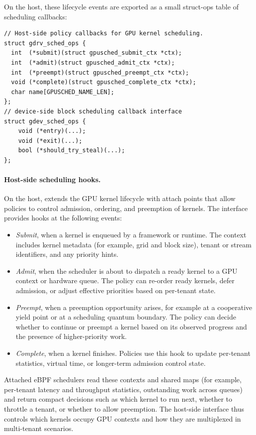 On the host, these lifecycle events are exported as a small struct-ops table of
scheduling callbacks:

\begin{verbatim}
// Host-side policy callbacks for GPU kernel scheduling.
struct gdrv_sched_ops {
  int  (*submit)(struct gpusched_submit_ctx *ctx);
  int  (*admit)(struct gpusched_admit_ctx *ctx);
  int  (*preempt)(struct gpusched_preempt_ctx *ctx);
  void (*complete)(struct gpusched_complete_ctx *ctx);
  char name[GPUSCHED_NAME_LEN];
};
// device-side block scheduling callback interface
struct gdev_sched_ops {
    void (*entry)(...);
    void (*exit)(...);
    bool (*should_try_steal)(...);
};
\end{verbatim}

\paragraph{Host-side scheduling hooks.}
On the host, \sys extends the GPU kernel lifecycle with attach points that allow
policies to control admission, ordering, and preemption of kernels. The interface
provides hooks at the following events:

\begin{itemize}[leftmargin=*]
  \item \emph{Submit}, when a kernel is enqueued by a framework or runtime. The
        context includes kernel metadata (for example, grid and block size), tenant
        or stream identifiers, and any priority hints.
  \item \emph{Admit}, when the scheduler is about to dispatch a ready kernel to
        a GPU context or hardware queue. The policy can re-order ready kernels,
        defer admission, or adjust effective priorities based on per-tenant state.
  \item \emph{Preempt}, when a preemption opportunity arises, for example at a
        cooperative yield point or at a scheduling quantum boundary. The policy
        can decide whether to continue or preempt a kernel based on its observed
        progress and the presence of higher-priority work.
  \item \emph{Complete}, when a kernel finishes. Policies use this hook to update
        per-tenant statistics, virtual time, or longer-term admission control state.
\end{itemize}

Attached eBPF schedulers read these contexts and shared maps (for example, per-tenant
latency and throughput statistics, outstanding work across queues) and return compact
decisions such as which kernel to run next, whether to throttle a tenant, or whether
to allow preemption. The host-side interface thus controls which kernels occupy GPU
contexts and how they are multiplexed in multi-tenant scenarios.

